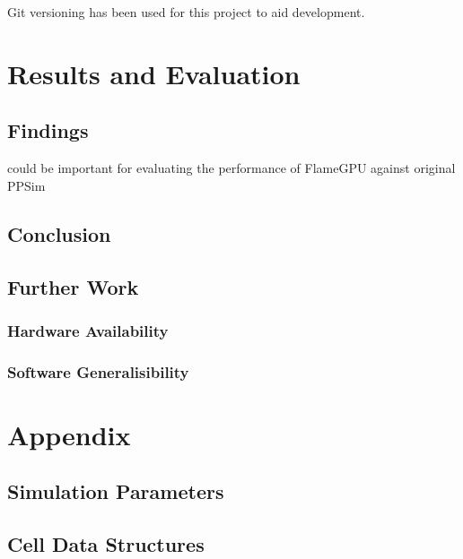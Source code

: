 \documentclass{UoYCSproject}
\begin{document}
Git versioning has been used for this project to aid development.

\chapter{Results and Evaluation}
\section{Findings}
\cite{statistical_tests} could be important for evaluating the performance of FlameGPU against original PPSim

\section{Conclusion}

\section{Further Work}
\subsection{Hardware Availability}

\subsection{Software Generalisibility}%


\printbibliography
\chapter{Appendix}
\section{Simulation Parameters}


\section{Cell Data Structures}
 
\end{document}
